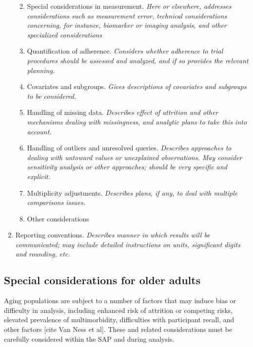 \documentclass[]{book}
\providecommand{\tightlist}{%
  \setlength{\itemsep}{0pt}\setlength{\parskip}{0pt}}
\begin{document}
\begin{enumerate}
  \begin{enumerate}
  \def\labelenumii{\alph{enumii}.}
  \tightlist
  \item
    Special considerations in measurement. \emph{Here or elsewhere,
    addresses considerations such as measurement error, technical
    considerations concerning, for instance, biomarker or imaging
    analysis, and other specialized considerations}
  \item
    Quantification of adherence. \emph{Considers whether adherence to
    trial procedures should be assessed and analyzed, and if so provides
    the relevant planning.}
  \item
    Covariates and subgroups. \emph{Gives descriptions of covariates and
    subgroups to be considered.}
  \item
    Handling of missing data. \emph{Describes effect of attrition and
    other mechanisms dealing with missingness, and analytic plans to
    take this into account.}
  \item
    Handling of outliers and unresolved queries. \emph{Describes
    approaches to dealing with untoward values or unexplained
    observations. May consider sensitivity analysis or other approaches;
    should be very specific and explicit.}
  \item
    Multiplicity adjustments. \emph{Describes plans, if any, to deal
    with multiple comparisons issues.}
  \item
    Other considerations
  \end{enumerate}
\item
  Reporting conventions. \emph{Describes manner in which results will be
  communicated; may include detailed instructions on units, significant
  digits and rounding, etc.}
\end{enumerate}

\hypertarget{special-considerations-for-older-adults-1}{\subsection{Special
considerations for older
adults}\label{special-considerations-for-older-adults-1}}

Aging populations are subject to a number of factors that may induce
bias or difficulty in analysis, including enhanced risk of attrition or
competing risks, elevated prevalence of multimorbidity, difficulties
with participant recall, and other factors {[}cite Van Ness et al{]}.
These and related considerations must be carefully considered within the
SAP and during analysis.
\end{document}
